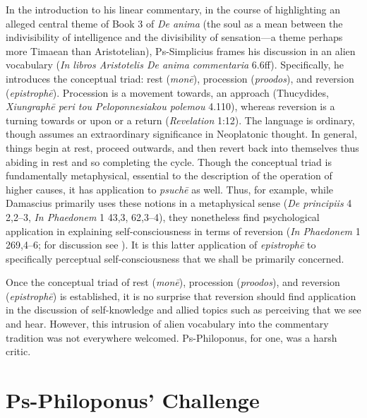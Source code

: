 In the introduction to his linear commentary, in the course of highlighting an alleged central theme of Book 3 of \emph{De anima} (the soul as a mean between the indivisibility of intelligence and the divisibility of sensation—a theme perhaps more Timaean than Aristotelian), Ps-Simplicius frames his discussion in an alien vocabulary (\emph{In libros Aristotelis De anima commentaria} 6.6ff). Specifically, he introduces the conceptual triad: rest (\emph{monē}), procession (\emph{proodos}), and reversion (\emph{epistrophē}). Procession is a movement towards, an approach (Thucydides, \emph{Xiungraphē peri tou Peloponnesiakou polemou} 4.110), whereas reversion is a turning towards or upon or a return (\emph{Revelation} 1:12). The language is ordinary, though assumes an extraordinary significance in Neoplatonic thought. In general, things begin at rest, proceed outwards, and then revert back into themselves thus abiding in rest and so completing the cycle. Though the conceptual triad is fundamentally metaphysical, essential to the description of the operation of higher causes, it has application to \emph{psuchē} as well. Thus, for example, while Damascius primarily uses these notions in a metaphysical sense (\emph{De principiis} 4 2,2–3, \emph{In Phaedonem} 1 43,3, 62,3–4), they nonetheless find psychological application in explaining self-consciousness in terms of reversion (\emph{In Phaedonem} 1 269,4–6; for discussion see \citealt[329–30]{Lautner:2014cz}). It is this latter application of \emph{epistrophē} to specifically perceptual self-consciousness that we shall be primarily concerned.

Once the conceptual triad of rest (\emph{monē}), procession (\emph{proodos}), and reversion (\emph{epistrophē}) is established, it is no surprise that reversion should find application in the discussion of self-knowledge and allied topics such as perceiving that we see and hear. However, this intrusion of alien vocabulary into the commentary tradition was not everywhere welcomed. Ps-Philoponus, for one, was a harsh critic.


\section{Ps-Philoponus' Challenge} %
\label{sec:philoponus_challenge}


